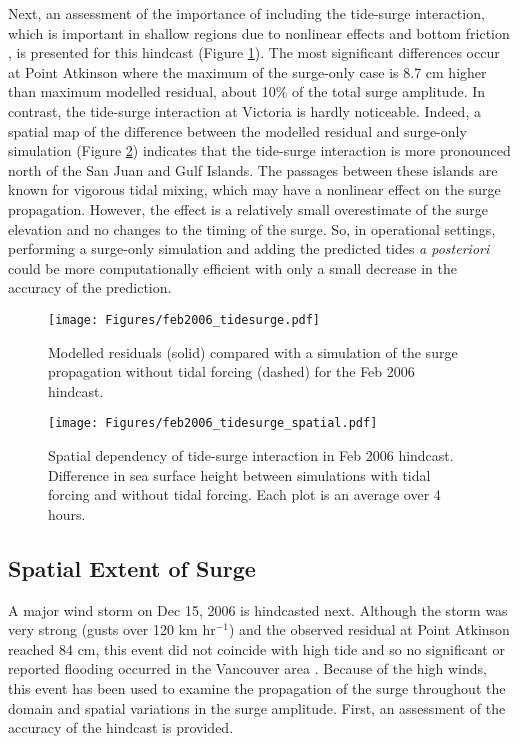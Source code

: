 \documentclass{tATO2e}
\begin{document}
Next, an assessment of the importance of including the tide-surge interaction, which is important in shallow regions due to nonlinear effects and bottom friction \citep{bernier2007tide}, is presented for this hindcast (Figure \ref{fig:tidesurge}). The most significant differences occur at Point Atkinson where the maximum of the surge-only case is 8.7 cm higher than maximum modelled residual, about 10\% of the total surge amplitude.  In contrast, the tide-surge interaction at Victoria is hardly noticeable. Indeed, a spatial map of the difference between the modelled residual and surge-only simulation (Figure \ref{fig:tidesurge_spatial}) indicates that the tide-surge interaction is more pronounced north of the San Juan and Gulf Islands. The passages between these islands are known for vigorous tidal mixing, which may have a nonlinear effect on the surge propagation. However, the effect is a relatively small overestimate of the surge elevation and no changes to the timing of the surge. So, in operational settings, performing a surge-only simulation and adding the predicted tides \textit{a posteriori} could be more computationally efficient with only a small decrease in the accuracy of the prediction. 

\begin{figure}
\centering
\texttt{[image: Figures/feb2006\_tidesurge.pdf]}
\caption{Modelled residuals (solid) compared with a simulation of the surge propagation without tidal forcing (dashed) for the Feb 2006 hindcast. }
\label{fig:tidesurge}
\end{figure}

\begin{figure}
\centering
\texttt{[image: Figures/feb2006\_tidesurge\_spatial.pdf]}
\caption{Spatial dependency of tide-surge interaction in Feb 2006 hindcast. Difference in sea surface height between simulations with tidal forcing and without tidal forcing. Each plot is an average over 4 hours. }
\label{fig:tidesurge_spatial}
\end{figure}


\subsection{Spatial Extent of Surge}\label{sec:spatial}
A major wind storm on Dec 15, 2006 is hindcasted next. Although the storm was very strong (gusts over 120 km hr$^{-1}$) and the observed residual at Point Atkinson reached 84 cm, this event did not coincide with high tide and so no significant or reported flooding occurred in the Vancouver area \citep{forseth2006adaptation}. Because of the high winds, this event has been used to examine the propagation of the surge throughout the domain and spatial variations in the surge amplitude. First, an assessment of the accuracy of the hindcast is provided. 
\end{document}
